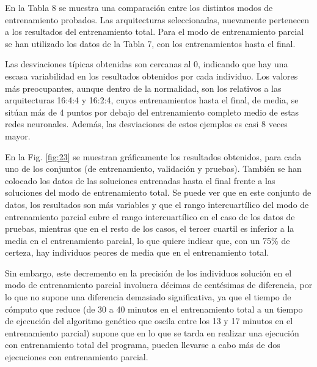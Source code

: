 \documentclass[spanish,a4paper,12pt,twoside]{report}
\begin{document}
  En la Tabla 8 se muestra una comparación entre los distintos modos de entrenamiento probados. Las arquitecturas seleccionadas, nuevamente pertenecen a los resultados del entrenamiento total. Para el modo de entrenamiento parcial se han utilizado los datos de la Tabla 7, con los entrenamientos hasta el final. \par
  Las desviaciones típicas obtenidas son cercanas al 0, indicando que hay una escasa variabilidad en los resultados obtenidos por cada individuo. Los valores más preocupantes, aunque dentro de la normalidad, son los relativos a las arquitecturas 16:4:4 y 16:2:4, cuyos entrenamientos hasta el final, de media, se sitúan más de 4 puntos por debajo del entrenamiento completo medio de estas redes neuronales. Además, las desviaciones de estos ejemplos es casi 8 veces mayor. \par
  En la Fig. \ref{fig:23} se muestran gráficamente los resultados obtenidos, para cada uno de los conjuntos (de entrenamiento, validación y pruebas). También se han colocado los datos de las soluciones entrenadas hasta el final frente a las soluciones del modo de entrenamiento total. Se puede ver que en este conjunto de datos, los resultados son más variables y que el rango intercuartílico del modo de entrenamiento parcial cubre el rango intercuartílico en el caso de los datos de pruebas, mientras que en el resto de los casos, el tercer cuartil es inferior a la media en el entrenamiento parcial, lo que quiere indicar que, con un 75\% de certeza, hay individuos peores de media que en el entrenamiento total. \par
  Sin embargo, este decremento en la precisión de los individuos solución en el modo de entrenamiento parcial involucra décimas de centésimas de diferencia, por lo que no supone una diferencia demasiado significativa, ya que el tiempo de cómputo que reduce (de 30 a 40 minutos en el entrenamiento total a un tiempo de ejecución del algoritmo genético que oscila entre los 13 y 17 minutos en el entrenamiento parcial) supone que en lo que se tarda en realizar una ejecución con entrenamiento total del programa, pueden llevarse a cabo más de dos ejecuciones con entrenamiento parcial.
\end{document}

